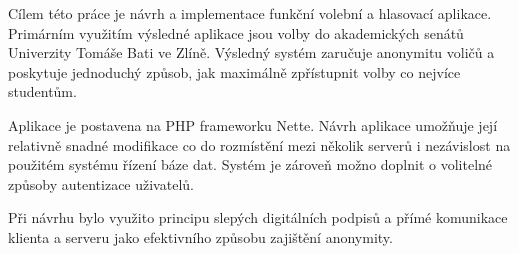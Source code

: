 Cílem této práce je návrh a implementace funkční volební a hlasovací aplikace. Primárním využitím výsledné aplikace jsou volby do akademických senátů Univerzity Tomáše Bati ve Zlíně. Výsledný systém zaručuje anonymitu voličů a poskytuje jednoduchý způsob, jak maximálně zpřístupnit volby co nejvíce studentům.

Aplikace je postavena na PHP frameworku Nette. Návrh aplikace umožňuje její relativně snadné modifikace co do rozmístění mezi několik serverů i nezávislost na použitém systému řízení báze dat. Systém je zároveň možno doplnit o volitelné způsoby autentizace uživatelů.

Při návrhu bylo využito principu slepých digitálních podpisů a přímé komunikace klienta a serveru jako efektivního způsobu zajištění anonymity.